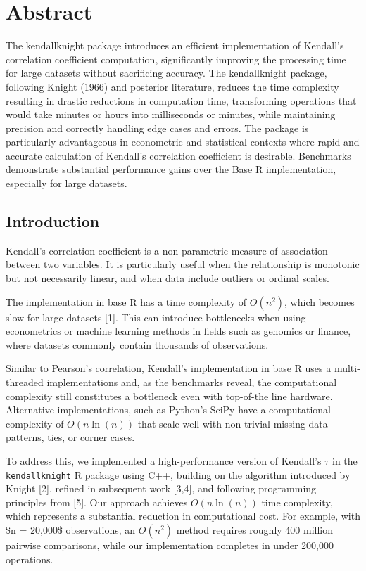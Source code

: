 \documentclass[
  10pt,
  letterpaper,
]{article}
\begin{document}
\section*{Abstract}
The kendallknight package introduces an efficient implementation of
Kendall's correlation coefficient computation, significantly improving
the processing time for large datasets without sacrificing accuracy. The
kendallknight package, following Knight (1966) and posterior literature,
reduces the time complexity resulting in drastic reductions in
computation time, transforming operations that would take minutes or
hours into milliseconds or minutes, while maintaining precision and
correctly handling edge cases and errors. The package is particularly
advantageous in econometric and statistical contexts where rapid and
accurate calculation of Kendall's correlation coefficient is desirable.
Benchmarks demonstrate substantial performance gains over the Base R
implementation, especially for large datasets.


\linenumbers

\subsection{Introduction}\label{introduction}

Kendall's correlation coefficient is a non-parametric measure of
association between two variables. It is particularly useful when the
relationship is monotonic but not necessarily linear, and when data
include outliers or ordinal scales.

The implementation in base R has a time complexity of \(O(n^2)\), which
becomes slow for large datasets {[}1{]}. This can introduce bottlenecks
when using econometrics or machine learning methods in fields such as
genomics or finance, where datasets commonly contain thousands of
observations.

Similar to Pearson's correlation, Kendall's implementation in base R
uses a multi-threaded implementations and, as the benchmarks reveal, the
computational complexity still constitutes a bottleneck even with
top-of-the line hardware. Alternative implementations, such as Python's
SciPy have a computational complexity of \(O(n \ln(n))\) that scale well
with non-trivial missing data patterns, ties, or corner cases.

To address this, we implemented a high-performance version of Kendall's
\(\tau\) in the \texttt{kendallknight} R package using C++, building on
the algorithm introduced by Knight {[}2{]}, refined in subsequent work
{[}3,4{]}, and following programming principles from {[}5{]}. Our
approach achieves \(O(n \ln(n))\) time complexity, which represents a
substantial reduction in computational cost. For example, with \$n =
20,000\$ observations, an \(O(n^2)\) method requires roughly 400 million
pairwise comparisons, while our implementation completes in under
200,000 operations.
\end{document}
